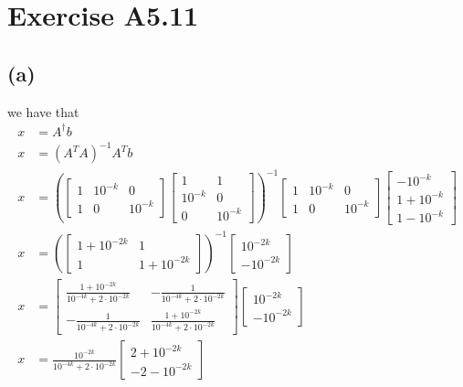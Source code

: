\section*{Exercise A5.11}
\subsection*{(a)}
we have that 
\begin{align*}
    x&=A^{\dagger}b\\
    x&=(A^TA)^{-1}A^Tb\\
    x&=\left(\begin{bmatrix}
        1 & 10^{-k} & 0\\
        1 & 0 & 10^{-k}
    \end{bmatrix}
    \begin{bmatrix}
        1 & 1\\
        10^{-k} & 0\\
        0 & 10^{-k}
    \end{bmatrix}\right)^{-1}
    \begin{bmatrix}
        1 & 10^{-k} & 0\\
        1 & 0 & 10^{-k}
    \end{bmatrix}
    \begin{bmatrix}
        -10^{-k}\\
        1+10^{-k}\\
        1-10^{-k}
    \end{bmatrix}\\
    x&=\left(\begin{bmatrix}
        1+10^{-2k} & 1\\
        1 & 1+10^{-2k}
    \end{bmatrix}\right)^{-1}\begin{bmatrix}
        10^{-2k}\\
        -10^{-2k}
    \end{bmatrix}\\
    x&=\begin{bmatrix}\frac{1+10^{-2k}}{10^{-4k}+2\cdot10^{-2k}}&-\frac{1}{10^{-4k}+2\cdot10^{-2k}}\\ -\frac{1}{10^{-4k}+2\cdot10^{-2k}}&\frac{1+10^{-2k}}{10^{-4k}+2\cdot10^{-2k}}
    \end{bmatrix}\begin{bmatrix}
        10^{-2k}\\
        -10^{-2k}
    \end{bmatrix}\\
    x&=\frac{10^{-2k}}{10^{-4k}+2\cdot10^{-2k}}\begin{bmatrix}
        2+10^{-2k}\\
        -2-10^{-2k}
    \end{bmatrix}
\end{align*}
